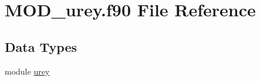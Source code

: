 \hypertarget{MOD__urey_8f90}{\section{M\-O\-D\-\_\-urey.\-f90 File Reference}
\label{MOD__urey_8f90}
}
\subsection*{Data Types}
\begin{DoxyCompactItemize}
\item 
module \hyperlink{classurey}{urey}
\end{DoxyCompactItemize}
